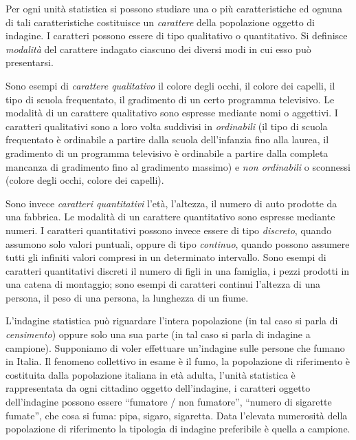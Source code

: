 \begin{definizione}
Per ogni unità statistica si possono studiare una o più caratteristiche ed ognuna di tali caratteristiche costituisce un \emph{carattere} della popolazione oggetto
di indagine. I caratteri possono essere di tipo qualitativo o quantitativo.
Si definisce \emph{modalità} del carattere indagato ciascuno dei diversi modi in cui esso può presentarsi.
\end{definizione}

Sono esempi di \emph{carattere qualitativo} il colore degli occhi, il colore dei capelli, il tipo di scuola frequentato, il gradimento di un certo programma televisivo.
Le modalità di un carattere qualitativo sono espresse mediante nomi o aggettivi.
I caratteri qualitativi sono a loro volta suddivisi in \emph{ordinabili} (il tipo di scuola frequentato è ordinabile a partire dalla scuola dell'infanzia fino alla laurea,
il gradimento di un programma televisivo è ordinabile a partire dalla completa mancanza di gradimento fino al gradimento massimo) e \emph{non ordinabili} o sconnessi
(colore degli occhi, colore dei capelli).

Sono invece \emph{caratteri quantitativi} l'età, l'altezza, il numero di auto prodotte da una fabbrica. Le modalità di un carattere quantitativo sono espresse mediante numeri.
I caratteri quantitativi possono invece essere di tipo \emph{discreto}, quando assumono solo valori puntuali, oppure di tipo \emph{continuo}, quando possono assumere
tutti gli infiniti valori compresi in un determinato intervallo. Sono esempi di caratteri quantitativi discreti il numero di figli in una famiglia,
i pezzi prodotti in una catena di montaggio; sono esempi di caratteri continui l'altezza di una persona, il peso di una persona, la lunghezza di un fiume.

L'indagine statistica può riguardare l'intera popolazione (in tal caso si parla di \emph{censimento}) oppure solo una sua parte (in tal caso si parla di indagine a campione).
Supponiamo di voler effettuare un'indagine sulle persone che fumano in Italia. Il fenomeno collettivo in esame è il fumo, la popolazione di riferimento
è costituita dalla popolazione italiana in età adulta, l'unità statistica è rappresentata da ogni cittadino oggetto dell'indagine, i caratteri oggetto
dell'indagine possono essere ``fumatore / non fumatore'', ``numero di sigarette fumate'', che cosa si fuma: pipa, sigaro, sigaretta. Data l'elevata numerosità
della popolazione di riferimento la tipologia di indagine preferibile è quella a campione.

